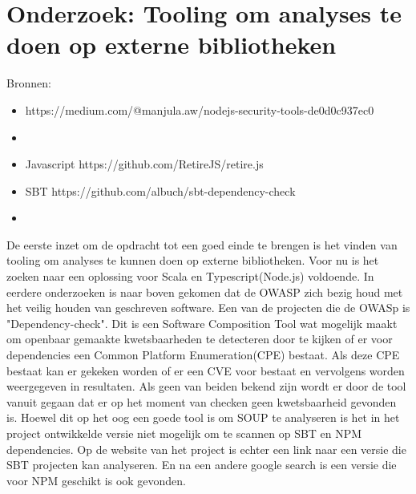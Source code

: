 
\chapter{Onderzoek: Tooling om analyses te doen op externe bibliotheken}
Bronnen:

\begin{itemize}
    \item https://medium.com/@manjula.aw/nodejs-security-tools-de0d0c937ec0
    \item
\end{itemize}
\begin{itemize}
    \item Javascript     https://github.com/RetireJS/retire.js
    \item SBT https://github.com/albuch/sbt-dependency-check
    \item
\end{itemize}
De eerste inzet om de opdracht tot een goed einde te brengen is het vinden van tooling om analyses te kunnen doen op externe bibliotheken. Voor nu is het zoeken naar een oplossing voor Scala en Typescript(Node.js) voldoende. In eerdere onderzoeken is naar boven gekomen dat de OWASP zich bezig houd met het veilig houden van geschreven software. Een van de projecten die de OWASp is "Dependency-check". Dit is een Software Composition Tool wat mogelijk maakt om openbaar gemaakte kwetsbaarheden te detecteren door te kijken of er voor dependencies een Common Platform Enumeration(CPE) bestaat. Als deze CPE bestaat kan er gekeken worden of er een CVE voor bestaat en vervolgens worden weergegeven in resultaten. Als geen van beiden bekend zijn wordt er door de tool vanuit gegaan dat er op het moment van checken geen kwetsbaarheid gevonden is. Hoewel dit op het oog een goede tool is om SOUP te analyseren is het in het project ontwikkelde versie niet mogelijk om te scannen op SBT en NPM dependencies. Op de website van het project is echter een link naar een versie die SBT projecten kan analyseren. En na een andere google search is een versie die voor NPM geschikt is ook gevonden.

